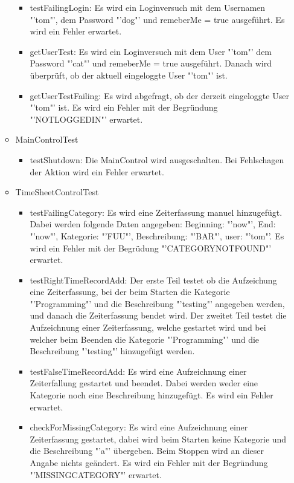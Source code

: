\begin{itemize}
\begin{itemize}
\begin{itemize}
            \item testFailingLogin: Es wird ein Loginversuch mit dem Usernamen "'tom"', dem Password "'dog"' und remeberMe = true ausgeführt. Es wird ein Fehler erwartet.
            \item getUserTest: Es wird ein Loginversuch mit dem User "'tom"' dem Password "'cat"' und remeberMe = true ausgeführt. Danach wird überprüft, ob der aktuell eingeloggte User "'tom"' ist.
            \item getUserTestFailing: Es wird abgefragt, ob der derzeit eingeloggte User "'tom"' ist. Es wird ein Fehler mit der Begründung "'NOTLOGGEDIN"' erwartet.
          \end{itemize}
          \item MainControlTest
            \begin{itemize}
              \item testShutdown: Die MainControl wird ausgeschalten. Bei Fehlschagen der Aktion wird ein Fehler erwartet.
            \end{itemize}
          \item TimeSheetControlTest
            \begin{itemize} 
              \item testFailingCategory: Es wird eine Zeiterfassung manuel hinzugefügt. Dabei werden folgende Daten angegeben: Beginning: "'now"', End: "'now"', Kategorie: "'FUU"', Beschreibung: "'BAR"', user: "'tom"'. Es wird ein Fehler mit der Begrüdung "'CATEGORYNOTFOUND"' erwartet.
              \item testRightTimeRecordAdd: Der erste Teil testet ob die Aufzeichung eine Zeiterfassung, bei der beim Starten die Kategorie "'Programming"' und die Beschreibung "'testing"' angegeben werden, und danach die Zeiterfassung bendet wird. Der zweitet Teil testet die Aufzeichnung einer Zeiterfassung, welche gestartet wird und bei welcher beim Beenden die Kategorie "'Programming"' und die Beschreibung "'testing"' hinzugefügt werden.
              \item testFalseTimeRecordAdd: Es wird eine Aufzeichnung einer Zeiterfallung gestartet und beendet. Dabei werden weder eine Kategorie noch eine Beschreibung hinzugefügt. Es wird ein Fehler erwartet.
              \item checkForMissingCategory: Es wird eine Aufzeichnung einer Zeiterfassung gestartet, dabei wird beim Starten keine Kategorie und die Beschreibung "'a"' übergeben. Beim Stoppen wird an dieser Angabe nichts geändert. Es wird ein Fehler mit der Begründung "'MISSINGCATEGORY"' erwartet.

\end{itemize}
\end{itemize}
\end{itemize}
